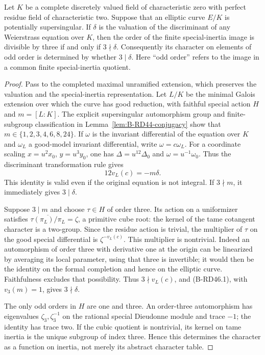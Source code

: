 \begin{lemma}
\label{lem:B-RD46-discriminant}
Let $K$ be a complete discretely valued field of characteristic zero
with perfect residue field of characteristic two. Suppose that an
elliptic curve $E/K$ is potentially supersingular. If $\delta$ is the
valuation of the discriminant of any Weierstrass equation over $K$,
then the order of the finite special-inertia image is divisible by
three if and only if $3\nmid\delta$. Consequently its character on
elements of odd order is determined by whether $3\mid\delta$.
Here ``odd order'' refers to the image in a common finite
special-inertia quotient.
\end{lemma}
\begin{proof}
Pass to the completed maximal unramified extension, which preserves
the valuation and the special-inertia representation. Let $L/K$ be
the minimal Galois extension over which the curve has good reduction,
with faithful special action $H$ and $m=[L:K]$. The explicit
supersingular automorphism group and finite-subgroup classification
in Lemma~\ref{lem:B-RD44-conjugacy} show that
$m\in\{1,2,3,4,6,8,24\}$.
If $\omega$ is the invariant differential of the equation over $K$
and $\omega_L$ a good-model invariant differential, write
$\omega=c\omega_L$. For a coordinate scaling $x=u^2x_0$, $y=u^3y_0$, one has
$\Delta=u^{12}\Delta_0$ and $\omega=u^{-1}\omega_0$.
Thus the discriminant transformation rule gives
\[
                         12v_L(c)=-m\delta.             \tag{B-RD46.1}
\]
This identity is valid even if the original equation is not integral.
If $3\nmid m$, it immediately gives $3\mid\delta$.

Suppose $3\mid m$ and choose $\tau\in H$ of order three.
Its action on a uniformizer satisfies
$\overline{\tau(\pi_L)/\pi_L}=\zeta$, a primitive cube root:
the kernel of the tame cotangent character is a two-group.
Since the residue action is trivial, the multiplier of $\tau$ on
the good special differential is $\zeta^{-v_L(c)}$.
This multiplier is nontrivial. Indeed an automorphism of order
three with derivative one at the origin can be linearized by
averaging its local parameter, using that three is invertible;
it would then be the identity on the formal completion and hence
on the elliptic curve. Faithfulness excludes that possibility.
Thus $3\nmid v_L(c)$, and (B-RD46.1), with $v_3(m)=1$, gives
$3\nmid\delta$.

The only odd orders in $H$ are one and three. An order-three
automorphism has eigenvalues $\zeta_3,\zeta_3^{-1}$ on the
rational special Dieudonne module and trace $-1$; the identity
has trace two. If the cubic quotient is nontrivial, its kernel
on tame inertia is the unique subgroup of index three.
Hence this determines the character as a function on inertia,
not merely its abstract character table.
\end{proof}

